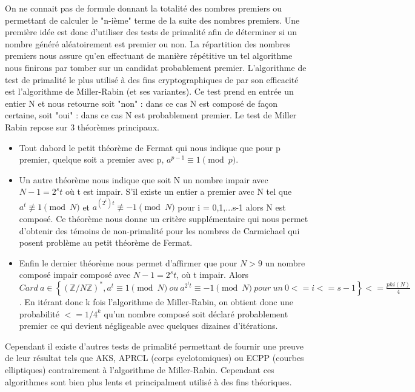 \documentclass{article}
\begin{document}
On ne connait pas de formule donnant la totalité des nombres premiers ou permettant de calculer le "n-ième" terme de la suite des nombres premiers. Une première idée est donc d'utiliser des tests de primalité afin de déterminer si un nombre généré aléatoirement est premier ou non. La répartition des nombres premiers nous assure qu'en effectuant de manière répétitive un tel algorithme nous finirons par tomber sur un candidat probablement premier. \newline
L'algorithme de test de primalité le plus utilisé à des fins cryptographiques de par son efficacité  est l'algorithme de Miller-Rabin (et ses variantes). Ce test  prend en entrée un entier N et nous retourne soit "non" : dans ce cas N est composé de façon certaine, soit "oui" : dans ce cas N est probablement premier. \newline
Le test de Miller Rabin repose sur 3 théorèmes
principaux. \newline
\begin{itemize}
\item Tout dabord le petit théorème de Fermat qui nous indique que pour p premier, quelque soit a premier avec p, $a^{p-1} \equiv 1 \pmod p$. \newline

\item Un autre théorème nous indique que soit N un nombre impair avec $N-1 = 2^{s}t$ où t est impair. S'il existe un entier a premier avec N tel que $a^t  \not\equiv 1 \pmod N$ et $a^{(2^i)t} \not\equiv -1 \pmod N$ pour i = 0,1,...s-1 alors N est composé. Ce théorème nous donne un critère supplémentaire qui nous permet d'obtenir des témoins de non-primalité pour les nombres de Carmichael qui posent problème au petit théorème de Fermat. \newline

\item Enfin le dernier théorème nous permet d'affirmer que pour $N > 9$ un nombre composé impair composé avec $N-1 = 2^{s}t$, où t impair. Alors $Card~a \in \left\{(\mathbb{Z}/N\mathbb{Z})^*, a^t \equiv 1 \pmod N~ou~ a^{2^{i}t} \equiv -1 \pmod N~pour~un~0<=i<=s-1\right\} <= \frac{phi(N)}{4}$. En itérant donc k fois l'algorithme de Miller-Rabin, on obtient donc une probabilité $<= 1/4^k$ qu'un nombre composé soit déclaré probablement premier ce qui devient négligeable avec quelques dizaines d'itérations.\newline
\end{itemize} 

Cependant il existe d'autres tests de primalité permettant de fournir une preuve de leur résultat tels que AKS, APRCL (corps cyclotomiques) ou ECPP (courbes elliptiques) contrairement à l'algorithme de Miller-Rabin. Cependant ces algorithmes sont bien plus lents et principalment utilisé à des fins théoriques. \newline
\end{document}
